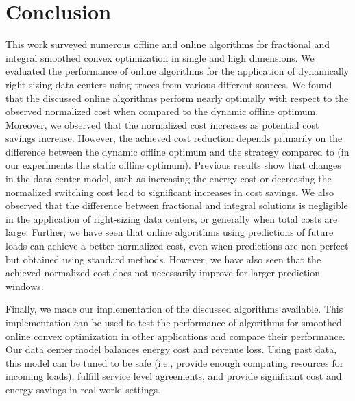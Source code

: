 
\chapter{Conclusion}\label{chapter:conclusion}

This work surveyed numerous offline and online algorithms for fractional and integral smoothed convex optimization in single and high dimensions. We evaluated the performance of online algorithms for the application of dynamically right-sizing data centers using traces from various different sources. We found that the discussed online algorithms perform nearly optimally with respect to the observed normalized cost when compared to the dynamic offline optimum. Moreover, we observed that the normalized cost increases as potential cost savings increase. However, the achieved cost reduction depends primarily on the difference between the dynamic offline optimum and the strategy compared to (in our experiments the static offline optimum). Previous results show that changes in the data center model, such as increasing the energy cost or decreasing the normalized switching cost lead to significant increases in cost savings. We also observed that the difference between fractional and integral solutions is negligible in the application of right-sizing data centers, or generally when total costs are large. Further, we have seen that online algorithms using predictions of future loads can achieve a better normalized cost, even when predictions are non-perfect but obtained using standard methods. However, we have also seen that the achieved normalized cost does not necessarily improve for larger prediction windows.

Finally, we made our implementation of the discussed algorithms available. This implementation can be used to test the performance of algorithms for smoothed online convex optimization in other applications and compare their performance. Our data center model balances energy cost and revenue loss. Using past data, this model can be tuned to be safe (i.e., provide enough computing resources for incoming loads), fulfill service level agreements, and provide significant cost and energy savings in real-world settings.